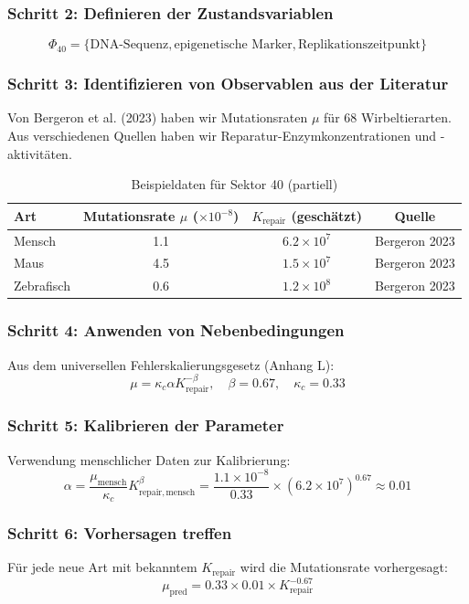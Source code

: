 \documentclass[13pt,a4paper]{article}
\begin{document}
	\subsubsection*{Schritt 2: Definieren der Zustandsvariablen}
	\[ \Phi_{40} = \{ \text{DNA-Sequenz}, \text{epigenetische Marker}, \text{Replikationszeitpunkt} \} \]
	
	\subsubsection*{Schritt 3: Identifizieren von Observablen aus der Literatur}
	Von Bergeron et al. (2023) haben wir Mutationsraten \(\mu\) für 68 Wirbeltierarten. Aus verschiedenen Quellen haben wir Reparatur-Enzymkonzentrationen und -aktivitäten.
	
	\begin{table}[htbp]
		\centering
		\caption{Beispieldaten für Sektor 40 (partiell)}
		\begin{tabular}{lccc}
			\toprule
			\textbf{Art} & \textbf{Mutationsrate \(\mu\) (\(\times 10^{-8}\))} & \textbf{\(K_{\mathrm{repair}}\) (geschätzt)} & \textbf{Quelle} \\
			\midrule
			Mensch & 1.1 & \(6.2 \times 10^7\) & Bergeron 2023 \\
			Maus & 4.5 & \(1.5 \times 10^7\) & Bergeron 2023 \\
			Zebrafisch & 0.6 & \(1.2 \times 10^8\) & Bergeron 2023 \\
			\bottomrule
		\end{tabular}
	\end{table}
	
	\subsubsection*{Schritt 4: Anwenden von Nebenbedingungen}
	Aus dem universellen Fehlerskalierungsgesetz (Anhang L):
	\[ \mu = \kappa_c \alpha K_{\mathrm{repair}}^{-\beta}, \quad \beta = 0.67, \quad \kappa_c = 0.33 \]
	
	\subsubsection*{Schritt 5: Kalibrieren der Parameter}
	Verwendung menschlicher Daten zur Kalibrierung:
	\[ \alpha = \frac{\mu_{\mathrm{mensch}}}{\kappa_c} K_{\mathrm{repair,mensch}}^{\beta} = \frac{1.1\times 10^{-8}}{0.33} \times (6.2\times 10^7)^{0.67} \approx 0.01 \]
	
	\subsubsection*{Schritt 6: Vorhersagen treffen}
	Für jede neue Art mit bekanntem \(K_{\mathrm{repair}}\) wird die Mutationsrate vorhergesagt:
	\[ \mu_{\mathrm{pred}} = 0.33 \times 0.01 \times K_{\mathrm{repair}}^{-0.67} \]
	
\end{document}
